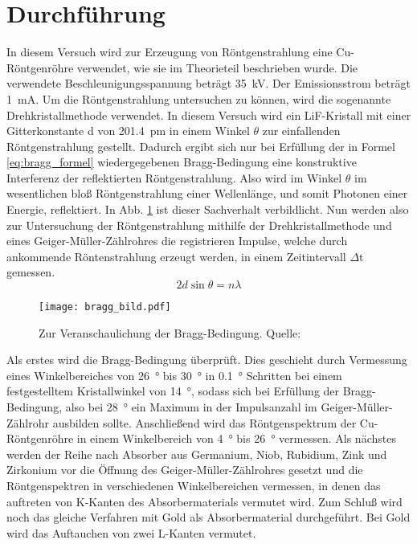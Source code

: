 
\section{Durchführung}
%
In diesem Versuch wird zur Erzeugung von Röntgenstrahlung eine
Cu-Röntgenröhre verwendet, wie sie im Theorieteil beschrieben wurde. Die
verwendete Beschleunigungsspannung beträgt \SI{35}{\kilo\volt}. Der
Emissionsstrom beträgt \SI{1}{\milli\ampere}.  Um die Röntgenstrahlung
untersuchen zu können, wird die sogenannte Drehkristallmethode
verwendet. In diesem Versuch wird ein LiF-Kristall mit einer
Gitterkonstante d von \SI{201.4}{\pico\metre} in einem Winkel $\theta$
zur einfallenden Röntgenstrahlung gestellt. Dadurch ergibt sich nur bei
Erfüllung der in Formel \eqref{eq:bragg_formel} wiedergegebenen
Bragg-Bedingung eine konstruktive Interferenz der reflektierten
Röntgenstrahlung. Also wird im Winkel $\theta$ im wesentlichen bloß
Röntgenstrahlung einer Wellenlänge, und somit Photonen einer Energie,
reflektiert. In Abb. \ref{fig:bragg_bild} ist dieser Sachverhalt
verbildlicht.  Nun werden also zur Untersuchung der Röntgenstrahlung
mithilfe der Drehkristallmethode und eines Geiger-Müller-Zählrohres die
registrieren Impulse, welche durch ankommende Röntenstrahlung erzeugt
werden, in einem Zeitintervall $\Delta$t gemessen.
%
\begin{equation}
2 d \sin{\theta} = n \lambda
\label{eq:bragg_formel}
\end{equation}
%
%
\begin{figure}
\centering
\texttt{[image: bragg\_bild.pdf]}
\caption{Zur Veranschaulichung der Bragg-Bedingung. Quelle: \textcite{v602}}
\label{fig:bragg_bild}
\end{figure}
%
Als erstes wird die Bragg-Bedingung überprüft. Dies geschieht durch
Vermessung eines Winkelbereiches von \SI{26}{\degree} bis
\SI{30}{\degree} in \SI{0.1}{\degree} Schritten bei einem festgestelltem
Kristallwinkel von \SI{14}{\degree}, sodass sich bei Erfüllung der
Bragg-Bedingung, also bei \SI{28}{\degree} ein Maximum in der
Impulsanzahl im Geiger-Müller-Zählrohr ausbilden sollte.  Anschließend
wird das Röntgenspektrum der Cu-Röntgenröhre in einem Winkelbereich von
\SI{4}{\degree} bis \SI{26}{\degree} vermessen.  Als nächstes werden der
Reihe nach Absorber aus Germanium, Niob, Rubidium, Zink und Zirkonium
vor die Öffnung des Geiger-Müller-Zählrohres gesetzt und die
Röntgenspektren in verschiedenen Winkelbereichen vermessen, in denen das
auftreten von K-Kanten des Absorbermaterials vermutet wird.  Zum Schluß
wird noch das gleiche Verfahren mit Gold als Absorbermaterial
durchgeführt. Bei Gold wird das Auftauchen von zwei L-Kanten vermutet.
%